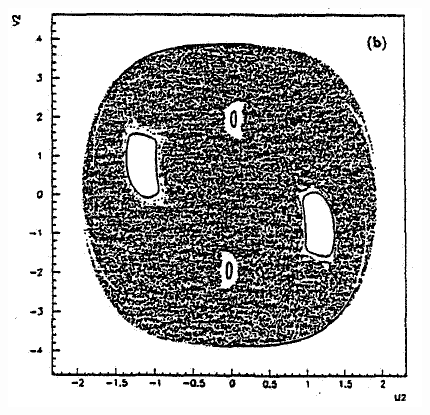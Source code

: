 \documentclass[a4,compress]{beamer}
\begin{document}

\begin{frame}
  \begin{columns}[c]
  \begin{column}{0.35\textwidth}
    \includegraphics[height=0.45\textheight]{ponicare-sections-e_30}


\end{column}
\end{columns}
\end{frame}
\end{document}
